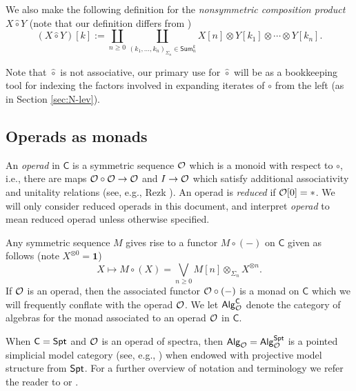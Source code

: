 We also make the following definition for the \textit{nonsymmetric composition product} $X\hat{\circ} Y$ (note that our definition differs from \cite{Har-2}) \begin{equation}
\label{comp-prod-nonsym}
    (X\hat{\circ} Y)[k] := \coprod_{n\geq 0} \coprod_{(k_1,\dots,k_n)_{\Sigma_n}\in \mathsf{Sum}_n^k} X[n]\otimes Y[k_1]\otimes \cdots \otimes Y[k_n].
\end{equation}

Note that $\hat{\circ}$ is not associative, our primary use for $\hat{\circ}$ will be as a bookkeeping tool for indexing the factors involved in expanding iterates of $\circ$ from the left (as in Section \ref{sec:N-lev}).


\subsection{Operads as monads}
An \textit{operad} in $\mathsf{C}$ is a  symmetric sequence $\mathcal{O}$ which is a monoid with respect to $\circ$, i.e., there are maps $\mathcal{O}\circ \mathcal{O}\to \mathcal{O}$ and $I\to \mathcal{O}$ which satisfy additional associativity and unitality relations (see, e.g.,  Rezk \cite{Rezk-thesis}). An operad is \textit{reduced} if $\mathcal{O}[0]=*$. We will only consider reduced operads in this document, and interpret \textit{operad} to mean reduced operad unless otherwise specified. 

Any symmetric sequence $M$ gives rise to a functor $M\circ (-)$ on $\mathsf{C}$ given as follows (note $X^{\otimes 0}=\mathbf{1}$) \[ X\mapsto M\circ (X) = \bigvee_{n\geq 0} M[n] \otimes_{\Sigma_n} X^{\otimes n}. \] If $\mathcal{O}$ is an operad, then the associated functor $\mathcal{O}\circ(-)$ is a monad on $\mathsf{C}$ which we will frequently conflate with the operad $\mathcal{O}$. We let $\mathsf{Alg}_{\mathcal{O}}^{\mathsf{C}}$ denote the category of algebras for the monad associated to an operad $\mathcal{O}$ in $\mathsf{C}$. 

When $\mathsf{C}=\mathsf{Spt}$ and $\mathcal{O}$ is an operad of spectra, then ${\mathsf{Alg}_{\mathcal{O}}}=\mathsf{Alg}_{\mathcal{O}}^{\mathsf{Spt}}$ is a pointed simplicial model category (see, e.g.,  \cite[]{Ching-Harper-Koszul}) when endowed with projective model structure from $\mathsf{Spt}$. For a further overview of notation and terminology we refer the reader to \cite[]{Har-1} or \cite[]{Rezk-thesis}. 

